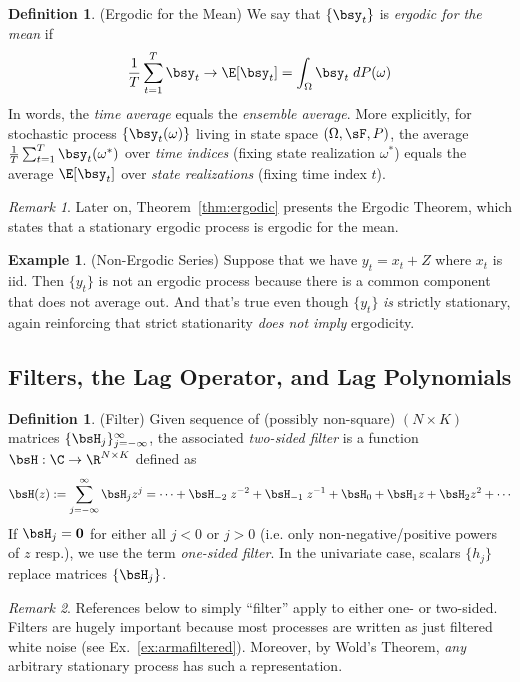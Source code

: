 \documentclass[12pt]{article}
\theoremstyle{plain}
\theoremstyle{definition}
\newtheorem{defn}[thm]{Definition}
\newtheorem{ex}[thm]{Example}
\theoremstyle{remark}
\newtheorem*{rmk}{Remark}
\newcommand{\ra}{\rightarrow}
\renewcommand{\bso}{\boldsymbol{0}}
\newcommand{\sumtT}{\sum^T_{t=1}}
\begin{document}
\begin{defn}(Ergodic for the Mean)
We say that $\{\bsy_t\}$ is \emph{ergodic for the mean} if
\begin{align*}
  \frac{1}{T}\sum^T_{t=1}\bsy_t \ra \E[\bsy_t]
  =\int_\Omega \bsy_t \; dP(\omega)
\end{align*}
In words, the \emph{time average} equals the \emph{ensemble average}.
More explicitly, for stochastic process $\{\bsy_t(\omega)\}$ living in
state space $(\Omega,\sF,P)$, the average $\frac{1}{T}\sumtT
\bsy_t(\omega^*)$ over \emph{time indices} (fixing state realization
$\omega^*$) equals the average $\E[\bsy_t]$ over \emph{state
realizations} (fixing time index $t$).
\end{defn}
\begin{rmk}
Later on, Theorem~\ref{thm:ergodic} presents the Ergodic Theorem, which
states that a stationary ergodic process is ergodic for the mean.
\end{rmk}

\begin{ex}(Non-Ergodic Series)
Suppose that we have $y_t=x_t+Z$ where $x_t$ is iid. Then $\{y_t\}$ is
not an ergodic process because there is a common component that does not
average out. And that's true even though $\{y_t\}$ \emph{is} strictly
stationary, again reinforcing that strict stationarity
\emph{does not imply} ergodicity.
\end{ex}


\clearpage
\subsection{Filters, the Lag Operator, and Lag Polynomials}

\begin{defn}(Filter)
Given sequence of (possibly non-square) $(N\times K)$ matrices
$\{\bsH_j\}_{j=-\infty}^\infty$, the associated
\emph{two-sided filter} is a function $\bsH:\C\ra\R^{N\times K}$ defined
as
\begin{align*}
  \bsH(z)
  := \sum_{j=-\infty}^\infty \bsH_j z^j
  = \cdots + \bsH_{-2}\;z^{-2} + \bsH_{-1}\;z^{-1} +
    \bsH_0 + \bsH_1 z + \bsH_2z^2 + \cdots
\end{align*}
If $\bsH_{j}=\bso$ for either all $j<0$ or $j>0$ (i.e. only
non-negative/positive powers of $z$ resp.), we use the term
\emph{one-sided filter}.
In the univariate case, scalars $\{h_j\}$ replace matrices $\{\bsH_j\}$.
\end{defn}
\begin{rmk}
References below to simply ``filter'' apply to either one- or two-sided.
Filters are hugely important because most processes are written as just
filtered white noise (see Ex.~\ref{ex:armafiltered}).  Moreover, by
Wold's Theorem, \emph{any} arbitrary stationary process has such a
representation.
\end{rmk}
\end{document}
